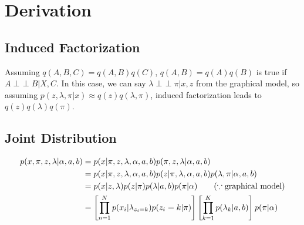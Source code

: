 \documentclass[a4paper,10.5pt,dvipdfmx]{jarticle}  %
\newcommand{\indep}{\mathop{\perp\!\!\!\!\perp}}
\begin{document}
\section{Derivation}
\subsection{Induced Factorization}
Assuming $q(A,B,C) = q(A,B) q(C)$, $q(A,B) = q(A)q(B)$ is true if $A \indep B | X, C$. In this case, we can say $\lambda \indep \pi | x, z$ from the graphical model, so assuming $p(z, \lambda, \pi | x) \approx q(z) q(\lambda, \pi)$, induced factorization leads to $q(z) q(\lambda) q(\pi)$.

\subsection{Joint Distribution}
\begin{align}
	p(x, \pi, z, \lambda| \alpha, a, b) &= p(x| \pi, z, \lambda, \alpha ,a, b) p(\pi, z, \lambda | \alpha, a,b)\\
&= p(x| \pi, z, \lambda, \alpha ,a, b) p(z| \pi, \lambda, \alpha, a, b) p(\lambda, \pi | \alpha, a, b)\\
&= p(x | z, \lambda) p(z | \pi) p(\lambda | a, b) p(\pi | \alpha) \qquad {\rm (\because graphical\ model)}\\
&= \left[ \prod_{n=1}^{N} p(x_i | \lambda_{z_i=k}) p(z_i = k | \pi)  \right] \left[ \prod_{k=1}^{K} p(\lambda_k| a,b)  \right]   p(\pi | \alpha) 
\end{align}
\end{document}
